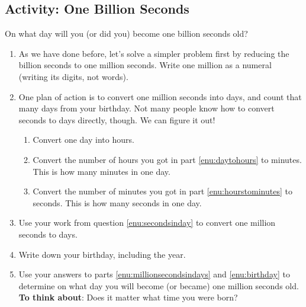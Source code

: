 \subsection{Activity: One Billion Seconds}
On what day will you (or did you) become one billion seconds old?
\begin{enumerate}
	\item \label{enu:billionsecondsbegin}As we have done before, let's solve a simpler problem first by reducing the billion seconds to one million seconds. Write one million as a numeral (writing its digits, not words). \wbvfill
	\item \label{enu:secondsinday}One plan of action is to convert one million seconds into days, and count that many days from your birthday. Not many people know how to convert seconds to days directly, though. We can figure it out!
	\begin{enumerate}
		\item \label{enu:daytohours}Convert one day into hours. \wbvfill
		\item \label{enu:hourstominutes}Convert the number of hours you got in part \ref{enu:daytohours} to minutes. This is how many minutes in one day. \wbvfill
		\item Convert the number of minutes you got in part \ref{enu:hourstominutes} to seconds. This is how many seconds in one day. \wbvfill
	\end{enumerate}
	\item \label{enu:millionsecondsindays}Use your work from question \ref{enu:secondsinday} to convert one million seconds to days.  \wbvfill
	\item \label{enu:birthday}Write down your birthday, including the year. \wbvfill
	\item \label{enu:billionsecondsend}Use your answers to parts \ref{enu:millionsecondsindays} and \ref{enu:birthday} to determine on what day you will become (or became) one million seconds old.\\ \textbf{To think about}: Does it matter what time you were born?  \wbvfill\wbnewpage

\end{enumerate}
